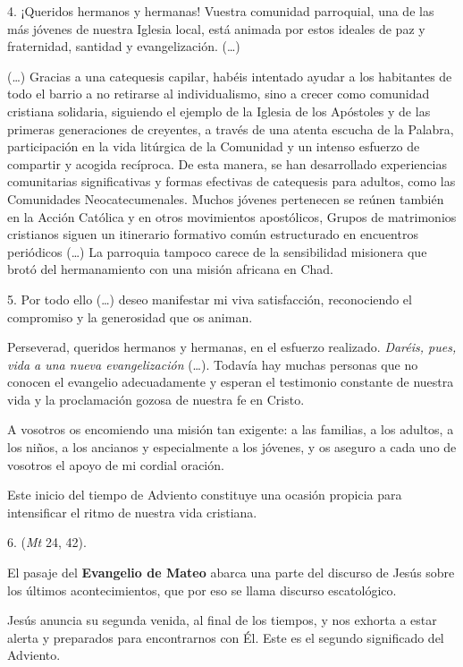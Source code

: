 \begin{body}
\begin{body}
		4. ¡Queridos hermanos y hermanas! Vuestra comunidad parroquial, una de las más jóvenes de nuestra Iglesia local, está animada por estos ideales de paz y fraternidad, santidad y evangelización. (\ldots{})
		
		(\ldots{}) Gracias a una catequesis capilar, habéis intentado ayudar a los habitantes de todo el barrio a no retirarse al individualismo, sino a crecer como comunidad cristiana solidaria, siguiendo el ejemplo de la Iglesia de los Apóstoles y de las primeras generaciones de creyentes, a través de una atenta escucha de la Palabra, participación en la vida litúrgica de la Comunidad y un intenso esfuerzo de compartir y acogida recíproca. De esta manera, se han desarrollado experiencias comunitarias significativas y formas efectivas de catequesis para adultos, como las Comunidades Neocatecumenales. Muchos jóvenes pertenecen se reúnen también en la Acción Católica y en otros movimientos apostólicos, Grupos de matrimonios cristianos siguen un itinerario formativo común estructurado en encuentros periódicos (\ldots{}) La parroquia tampoco carece de la sensibilidad misionera que brotó del hermanamiento con una misión africana en Chad.
		
		5. Por todo ello (\ldots{}) deseo manifestar mi viva satisfacción, reconociendo el compromiso y la generosidad que os animan.
		
		Perseverad, queridos hermanos y hermanas, en el esfuerzo realizado. \emph{Daréis, pues, vida a una nueva evangelización} (\ldots{}). Todavía hay muchas personas que no conocen el evangelio adecuadamente y esperan el testimonio constante de nuestra vida y la proclamación gozosa de nuestra fe en Cristo.
		
		A vosotros os encomiendo una misión tan exigente: a las familias, a los adultos, a los niños, a los ancianos y especialmente a los jóvenes, y os aseguro a cada uno de vosotros el apoyo de mi cordial oración.
		
		Este inicio del tiempo de Adviento constituye una ocasión propicia para intensificar el ritmo de nuestra vida cristiana.
		
		6.  (\emph{Mt} 24, 42).
		
		El pasaje del \textbf{Evangelio de Mateo} abarca una parte del discurso de Jesús sobre los últimos acontecimientos, que por eso se llama discurso escatológico.
		
		Jesús anuncia su segunda venida, al final de los tiempos, y nos exhorta a estar alerta y preparados para encontrarnos con Él. Este es el segundo significado del Adviento.
		

\end{body}
\end{body}
